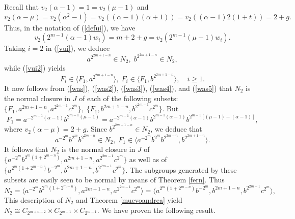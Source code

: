\documentclass{amsart}
\theoremstyle{definition}
\theoremstyle{remark}
\begin{document}
{Recall that
$
v_2(\alpha-1)=1=v_2(\mu-1)
$
and
$$
v_2(\alpha-\mu)=v_2(\alpha^2-1)=v_2((\alpha-1)(\alpha+1))=v_2((\alpha-1)2(1+t))=2+g.
$$
Thus, in the notation of (\ref{defui}), we have
$$
v_2(2^{m-1}(\alpha-1)w_i)=m+2+g=v_2(2^{m-1}(\mu-1)w_i).
$$
Taking $i=2$ in (\ref{vui}), we deduce 
\begin{equation}
\label{was4}
a^{2^{2m+1-n}}\in N_2,\; b^{2^{2m+1-n}}\in N_2,
\end{equation}
while (\ref{vui2}) yields
\begin{equation}
\label{was5}
F_i\in \langle F_1, a^{2^{2m+1-n}}\rangle,\; F_i\in \langle F_1, b^{2^{2m+1-n}}\rangle,\quad i\geq 1.
\end{equation}
It now follows from (\ref{was}), (\ref{was2}), (\ref{was3}), (\ref{was4}), and (\ref{was5}) that
$N_2$ is the normal closure in $J$ of each of the following subsets:
$
\{F_1, a^{2m+1-n}, a^{2^{2m-1}}c^{2^m}\},\;\{F_1, b^{2m+1-n}, b^{2^{2m-1}}c^{2^m}\}.
$
But
$$
F_1=a^{-2^{m-1}(\alpha-1)} b^{2^{m-1}(\mu-1)}=a^{-2^{m-1}(\alpha-1)} b^{2^{m-1}(\alpha-1)} b^{2^{m-1}[(\mu-1)-(\alpha-1)]},
$$
where $v_2(\alpha-\mu)=2+g$. Since $b^{2^{2m+1-n}}\in N_2$, we deduce that
$$
a^{-2^m}b^{2^m}b^{2^{2m-n}}\in N_2,\; F_1\in \langle a^{-2^m}b^{2^m}b^{2^{2m-n}}, b^{2^{2m+1-n}}\rangle.
$$
It follows that $N_2$ is the  normal closure in $J$ of $\{a^{-2^m}b^{2^{m}(1+2^{m-n})}, a^{2m+1-n}, a^{2^{2m-1}}c^{2^m}\}$ as well as of 
$\{a^{2^{m}(1+2^{m-n})}b^{-2^m}, b^{2m+1-n}, b^{2^{2m-1}}c^{2^m}\}$. The subgroups generated by these subsets
are easily seen to be normal by means of Theorem \ref{fern}. Thus
$$
N_2=\langle a^{-2^m}b^{2^{m}(1+2^{m-n})}, a^{2m+1-n}, a^{2^{2m-1}}c^{2^m}\rangle=
\langle a^{2^{m}(1+2^{m-n})} b^{-2^m}, b^{2m+1-n}, b^{2^{2m-1}}c^{2^m}\rangle,
$$
This description of $N_2$ and Theorem \ref{muevoandrea} yield 
$N_2\cong C_{2^{m+n-2}}\times C_{2^{m-1}}\times C_{2^{m-1}}$. We have proven the following result.

}
\end{document}
